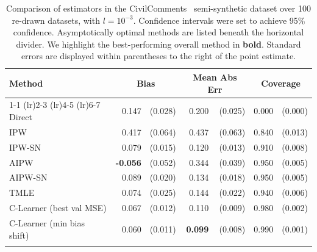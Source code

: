 \begin{table}[H]
\centering

\footnotesize
\begin{tabular}{lrrrrrr}
\toprule
Method & \multicolumn{2}{c}{Bias} & \multicolumn{2}{c}{Mean Abs Err} & \multicolumn{2}{c}{Coverage}\\ 
\cmidrule(lr){1-1}
\cmidrule(lr){2-3}
\cmidrule(lr){4-5}
\cmidrule(lr){6-7}
Direct & 0.147 & (0.028) & 0.200 & (0.025) & 0.000 & (0.000)\\
IPW & 0.417 & (0.064) & 0.437 & (0.063) & 0.840 & (0.013)\\
IPW-SN & 0.079 & (0.015) & 0.120 & (0.013) & 0.910 & (0.008)\\
\greymidrule
AIPW & \textbf{-0.056} & (0.052) & 0.344 & (0.039) & 0.950 & (0.005)\\
AIPW-SN & 0.089 & (0.020) & 0.134 & (0.018) & 0.950 & (0.005)\\
TMLE & 0.074 & (0.025) & 0.144 & (0.022) & 0.940 & (0.006)\\
C-Learner (best val MSE) & 0.067 & (0.012) & 0.110 & (0.009) & 0.980 & (0.002)\\
C-Learner (min bias shift) & 0.060 & (0.011) & \textbf{0.099} & (0.008) & 0.990 & (0.001)\\
\bottomrule
\vspace{0.05em}
\end{tabular}
\caption{Comparison of estimators in the CivilComments~\citep{civilcomments} semi-synthetic dataset over 100 re-drawn datasets, with $l=10^{-3}$. Confidence intervals were set to achieve 95\% confidence. Asymptotically optimal methods are listed beneath the horizontal divider. We highlight the best-performing overall method in \textbf{bold}. Standard errors are displayed within parentheses to the right of the point estimate.}
    \label{tab:nn_3}
\end{table}



